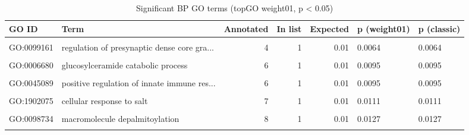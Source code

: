 \documentclass[
  11pt,
]{article}
\begin{document}
\begin{longtable}[t]{l>{\raggedright\arraybackslash}p{7cm}rrrll}
\caption{\label{tab:bp-table}Significant BP GO terms (topGO weight01, p < 0.05)}\\
\toprule
GO ID & Term & Annotated & In list & Expected & p (weight01) & p (classic)\\
\midrule
\cellcolor{gray!10}{GO:0032880} & \cellcolor{gray!10}{regulation of protein localization} & \cellcolor{gray!10}{147} & \cellcolor{gray!10}{3} & \cellcolor{gray!10}{0.23} & \cellcolor{gray!10}{0.0045} & \cellcolor{gray!10}{0.0015}\\
GO:0099161 & regulation of presynaptic dense core gra... & 4 & 1 & 0.01 & 0.0064 & 0.0064\\
\cellcolor{gray!10}{GO:0016082} & \cellcolor{gray!10}{synaptic vesicle priming} & \cellcolor{gray!10}{6} & \cellcolor{gray!10}{1} & \cellcolor{gray!10}{0.01} & \cellcolor{gray!10}{0.0095} & \cellcolor{gray!10}{0.0095}\\
GO:0006680 & glucosylceramide catabolic process & 6 & 1 & 0.01 & 0.0095 & 0.0095\\
\cellcolor{gray!10}{GO:0015937} & \cellcolor{gray!10}{coenzyme A biosynthetic process} & \cellcolor{gray!10}{6} & \cellcolor{gray!10}{1} & \cellcolor{gray!10}{0.01} & \cellcolor{gray!10}{0.0095} & \cellcolor{gray!10}{0.0095}\\
\addlinespace
GO:0045089 & positive regulation of innate immune res... & 6 & 1 & 0.01 & 0.0095 & 0.0095\\
\cellcolor{gray!10}{GO:0051224} & \cellcolor{gray!10}{negative regulation of protein transport} & \cellcolor{gray!10}{7} & \cellcolor{gray!10}{1} & \cellcolor{gray!10}{0.01} & \cellcolor{gray!10}{0.0111} & \cellcolor{gray!10}{0.0111}\\
GO:1902075 & cellular response to salt & 7 & 1 & 0.01 & 0.0111 & 0.0111\\
\cellcolor{gray!10}{GO:0043001} & \cellcolor{gray!10}{Golgi to plasma membrane protein transpo...} & \cellcolor{gray!10}{7} & \cellcolor{gray!10}{1} & \cellcolor{gray!10}{0.01} & \cellcolor{gray!10}{0.0111} & \cellcolor{gray!10}{0.0111}\\
GO:0098734 & macromolecule depalmitoylation & 8 & 1 & 0.01 & 0.0127 & 0.0127\\
\addlinespace
\cellcolor{gray!10}{GO:0035641} & \cellcolor{gray!10}{locomotory exploration behavior} & \cellcolor{gray!10}{9} & \cellcolor{gray!10}{1} & \cellcolor{gray!10}{0.01} & \cellcolor{gray!10}{0.0143} & \cellcolor{gray!10}{0.0143}\\

\end{longtable}
\end{document}
